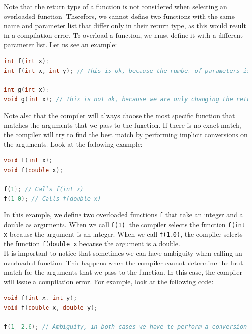 Note that the return type of a function is not considered when selecting an overloaded
function. Therefore, we cannot define two functions with the same name and parameter
list that differ only in their return type, as this would result in a compilation error.
To overload a function, we must define it with a different parameter list. Let us see
an example:\\

\begin{lstlisting}[language=C++]
int f(int x);
int f(int x, int y); // This is ok, because the number of parameters is different

int g(int x);
void g(int x); // This is not ok, because we are only changing the return type
\end{lstlisting}

Note also that the compiler will always choose the most specific function that matches
the arguments that we pass to the function. If there is no exact match, the compiler
will try to find the best match by performing implicit conversions on the arguments.
Look at the following example:\\

\begin{lstlisting}[language=C++]
void f(int x);
void f(double x);

f(1); // Calls f(int x)
f(1.0); // Calls f(double x)
\end{lstlisting}

In this example, we define two overloaded functions \texttt{f} that take an integer
and a double as arguments. When we call \texttt{f(1)}, the compiler selects the function
\texttt{f(int x} because the argument is an integer. When we call \texttt{f(1.0)}, the
compiler selects the function \texttt{f(double x} because the argument is a double.\\

It is important to notice that sometimes we can have ambiguity when calling an overloaded
function. This happens when the compiler cannot determine the best match for the arguments
that we pass to the function. In this case, the compiler will issue a compilation error.
For example, look at the following code:\\

\begin{lstlisting}[language=C++]
void f(int x, int y);
void f(double x, double y);

f(1, 2.6); // Ambiguity, in both cases we have to perform a conversion
\end{lstlisting}

